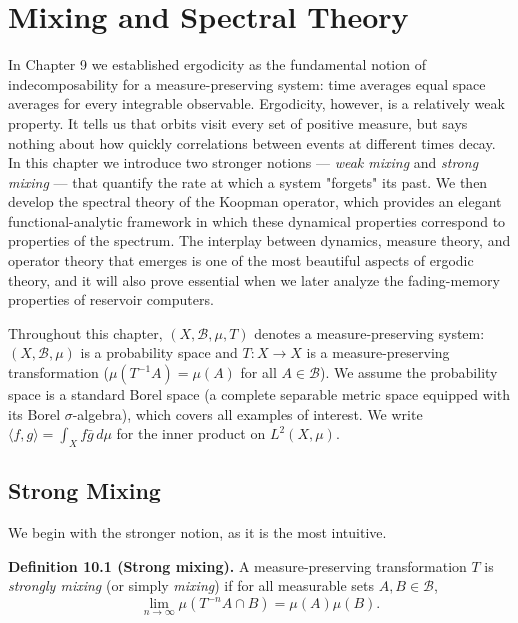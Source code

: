 \chapter{Mixing and Spectral Theory}\label{ch:10}

In Chapter 9 we established ergodicity as the fundamental notion of indecomposability for a measure-preserving system: time averages equal space averages for every integrable observable. Ergodicity, however, is a relatively weak property. It tells us that orbits visit every set of positive measure, but says nothing about how quickly correlations between events at different times decay. In this chapter we introduce two stronger notions --- \textit{weak mixing} and \textit{strong mixing} --- that quantify the rate at which a system "forgets" its past. We then develop the spectral theory of the Koopman operator, which provides an elegant functional-analytic framework in which these dynamical properties correspond to properties of the spectrum. The interplay between dynamics, measure theory, and operator theory that emerges is one of the most beautiful aspects of ergodic theory, and it will also prove essential when we later analyze the fading-memory properties of reservoir computers.

Throughout this chapter, $(X, \mathcal{B}, \mu, T)$ denotes a measure-preserving system: $(X, \mathcal{B}, \mu)$ is a probability space and $T: X \to X$ is a measure-preserving transformation ($\mu(T^{-1}A) = \mu(A)$ for all $A \in \mathcal{B}$). We assume the probability space is a standard Borel space (a complete separable metric space equipped with its Borel $\sigma$-algebra), which covers all examples of interest. We write $\langle f, g \rangle = \int_X f \bar{g} \, d\mu$ for the inner product on $L^2(X, \mu)$.


\bigskip


\section{Strong Mixing}\label{sec:10.1}

We begin with the stronger notion, as it is the most intuitive.

\textbf{Definition 10.1 (Strong mixing).} A measure-preserving transformation $T$ is \textit{strongly mixing} (or simply \textit{mixing}) if for all measurable sets $A, B \in \mathcal{B}$,
\begin{equation}\label{eq:10.1}\tag{10.1}
\lim_{n \to \infty} \mu(T^{-n}A \cap B) = \mu(A)\mu(B).
\end{equation}

